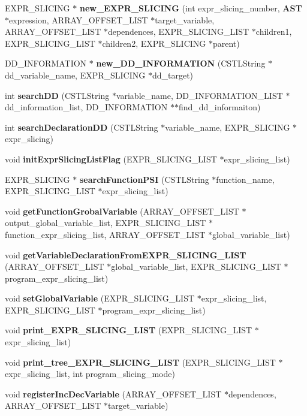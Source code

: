\begin{DoxyCompactItemize}
\item 
EXPR\_\-SLICING $\ast$ {\bf new\_\-EXPR\_\-SLICING} (int expr\_\-slicing\_\-number, {\bf AST} $\ast$expression, ARRAY\_\-OFFSET\_\-LIST $\ast$target\_\-variable, ARRAY\_\-OFFSET\_\-LIST $\ast$dependences, EXPR\_\-SLICING\_\-LIST $\ast$children1, EXPR\_\-SLICING\_\-LIST $\ast$children2, EXPR\_\-SLICING $\ast$parent)
\item 
DD\_\-INFORMATION $\ast$ {\bf new\_\-DD\_\-INFORMATION} (CSTLString $\ast$dd\_\-variable\_\-name, EXPR\_\-SLICING $\ast$dd\_\-target)
\item 
int {\bf searchDD} (CSTLString $\ast$variable\_\-name, DD\_\-INFORMATION\_\-LIST $\ast$dd\_\-information\_\-list, DD\_\-INFORMATION $\ast$$\ast$find\_\-dd\_\-informaiton)
\item 
int {\bf searchDeclarationDD} (CSTLString $\ast$variable\_\-name, EXPR\_\-SLICING $\ast$expr\_\-slicing)
\item 
void {\bf initExprSlicingListFlag} (EXPR\_\-SLICING\_\-LIST $\ast$expr\_\-slicing\_\-list)
\item 
EXPR\_\-SLICING $\ast$ {\bf searchFunctionPSI} (CSTLString $\ast$function\_\-name, EXPR\_\-SLICING\_\-LIST $\ast$expr\_\-slicing\_\-list)
\item 
void {\bf getFunctionGrobalVariable} (ARRAY\_\-OFFSET\_\-LIST $\ast$output\_\-global\_\-variable\_\-list, EXPR\_\-SLICING\_\-LIST $\ast$function\_\-expr\_\-slicing\_\-list, ARRAY\_\-OFFSET\_\-LIST $\ast$global\_\-variable\_\-list)
\item 
void {\bf getVariableDeclarationFromEXPR\_\-SLICING\_\-LIST} (ARRAY\_\-OFFSET\_\-LIST $\ast$global\_\-variable\_\-list, EXPR\_\-SLICING\_\-LIST $\ast$program\_\-expr\_\-slicing\_\-list)
\item 
void {\bf setGlobalVariable} (EXPR\_\-SLICING\_\-LIST $\ast$expr\_\-slicing\_\-list, EXPR\_\-SLICING\_\-LIST $\ast$program\_\-expr\_\-slicing\_\-list)
\item 
void {\bf print\_\-EXPR\_\-SLICING\_\-LIST} (EXPR\_\-SLICING\_\-LIST $\ast$expr\_\-slicing\_\-list)
\item 
void {\bf print\_\-tree\_\-EXPR\_\-SLICING\_\-LIST} (EXPR\_\-SLICING\_\-LIST $\ast$expr\_\-slicing\_\-list, int program\_\-slicing\_\-mode)
\item 
void {\bf registerIncDecVariable} (ARRAY\_\-OFFSET\_\-LIST $\ast$dependences, ARRAY\_\-OFFSET\_\-LIST $\ast$target\_\-variable)
\end{DoxyCompactItemize}


